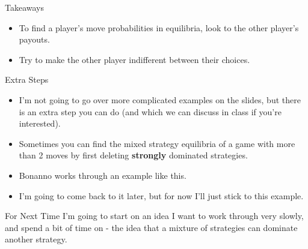 \documentclass[
  ignorenonframetext,
]{beamer}
\providecommand{\tightlist}{%
  \setlength{\itemsep}{0pt}\setlength{\parskip}{0pt}}
\begin{document}
\begin{frame}{Takeaways}
\protect\hypertarget{takeaways}{}
\begin{itemize}
\tightlist
\item
  To find a player's move probabilities in equilibria, look to the other
  player's payouts.
\item
  Try to make the other player indifferent between their choices.
\end{itemize}
\end{frame}

\begin{frame}{Extra Steps}
\protect\hypertarget{extra-steps}{}
\begin{itemize}
\tightlist
\item
  I'm not going to go over more complicated examples on the slides, but
  there is an extra step you can do (and which we can discuss in class
  if you're interested).
\item
  Sometimes you can find the mixed strategy equilibria of a game with
  more than 2 moves by first deleting \textbf{strongly} dominated
  strategies.
\item
  Bonanno works through an example like this.
\item
  I'm going to come back to it later, but for now I'll just stick to
  this example.
\end{itemize}
\end{frame}

\begin{frame}{For Next Time}
\protect\hypertarget{for-next-time}{}
I'm going to start on an idea I want to work through very slowly, and
spend a bit of time on - the idea that a mixture of strategies can
dominate another strategy.
\end{frame}
\end{document}
